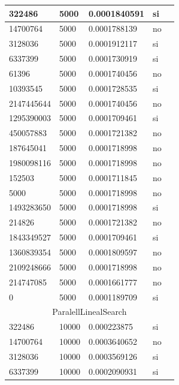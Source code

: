 \documentclass[12pt, fleqn]{article}                             %
\theoremstyle{break}                                            %
\begin{document}
\begin{longtable}{|m{5em}|m{5em}|m{10em}|m{5em}|@{}m{0pt}@{}}
            322486& 5000  & 0.0001840591 & si &\\[1em]    \hline
            14700764& 5000  & 0.0001788139 & no &\\[1em]    \hline
            3128036& 5000  & 0.0001912117 & si &\\[1em]    \hline
            6337399& 5000  & 0.0001730919 & si &\\[1em]    \hline
            61396& 5000  & 0.0001740456 & no &\\[1em]    \hline
            10393545& 5000  & 0.0001728535 & si &\\[1em]    \hline
            2147445644& 5000  & 0.0001740456 & no &\\[1em]    \hline
            1295390003& 5000  & 0.0001709461 & si &\\[1em]    \hline
            450057883& 5000  & 0.0001721382 & no &\\[1em]    \hline
            187645041& 5000  & 0.0001718998 & no &\\[1em]    \hline
            1980098116& 5000  & 0.0001718998 & no &\\[1em]    \hline
            152503& 5000  & 0.0001711845 & no &\\[1em]    \hline
            5000& 5000  & 0.0001718998 & no &\\[1em]    \hline
            1493283650& 5000  & 0.0001718998 & si &\\[1em]    \hline
            214826& 5000  & 0.0001721382 & no &\\[1em]    \hline
            1843349527& 5000  & 0.0001709461 & si &\\[1em]    \hline
            1360839354& 5000  & 0.0001809597 & no &\\[1em]    \hline
            2109248666& 5000  & 0.0001718998 & no &\\[1em]    \hline
            214747085& 5000  & 0.0001661777 & no &\\[1em]    \hline
            0& 5000  & 0.0001189709 & si &\\[1em]    \hline
            \multicolumn{5}{|c|}{ParalellLinealSearch}   \\          \hline
            322486& 10000  & 0.000223875 & si &\\[1em]    \hline
            14700764& 10000  & 0.0003640652 & no &\\[1em]    \hline
            3128036& 10000  & 0.0003569126 & si &\\[1em]    \hline
            6337399& 10000  & 0.0002090931 & si &\\[1em]    \hline

\end{longtable}
\end{document}
